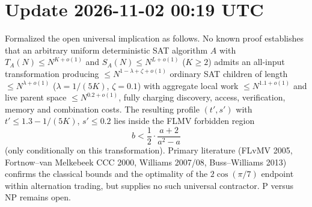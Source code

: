 
\section*{Update 2026-11-02 00:19 UTC}
Formalized the open universal implication as follows. No known proof establishes that an arbitrary uniform deterministic SAT algorithm $A$ with $T_A(N)\le N^{K+o(1)}$ and $S_A(N)\le N^{L+o(1)}$ ($K\ge 2$) admits an all-input transformation producing $\le N^{1-\lambda+\zeta+o(1)}$ ordinary SAT children of length $\le N^{\lambda+o(1)}$ ($\lambda=1/(5K)$, $\zeta=0.1$) with aggregate local work $\le N^{1.1+o(1)}$ and live parent space $\le N^{0.2+o(1)}$, fully charging discovery, access, verification, memory and combination costs. The resulting profile $(t',s')$ with $t'\le 1.3-1/(5K)$, $s'\le 0.2$ lies inside the FLMV forbidden region
\[
b < \frac12\cdot\frac{a+2}{a^2-a}
\]
(only conditionally on this transformation). Primary literature (FLvMV 2005, Fortnow–van Melkebeek CCC 2000, Williams 2007/08, Buss–Williams 2013) confirms the classical bounds and the optimality of the $2\cos(\pi/7)$ endpoint within alternation trading, but supplies no such universal contractor. P versus NP remains open.
